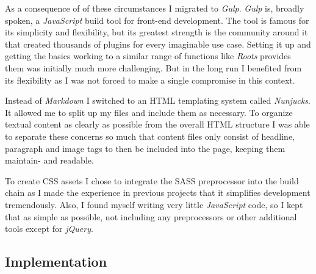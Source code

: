As a consequence of of these circumstances I migrated to \textit{Gulp}. \textit{Gulp} is, broadly spoken, a \textit{JavaScript} build tool for front-end development. The tool is famous for its simplicity and flexibility, but its greatest strength is the community around it that created thousands of plugins for every imaginable use case. Setting it up and getting the basics working to a similar range of functions like \textit{Roots} provides them was initially much more challenging. But in the long run I benefited from its flexibility as I was not forced to make a single compromise in this context.

Instead of \textit{Markdown} I switched to an \ac{HTML} templating system called \textit{Nunjucks}. It allowed me to split up my files and include them as necessary. To organize textual content as clearly as possible from the overall \ac{HTML} structure I was able to separate these concerns so much that content files only consist of headline, paragraph and image tags to then be included into the page, keeping them maintain- and readable.

To create \ac{CSS} assets I chose to integrate the \ac{SASS} preprocessor into the build chain as I made the experience in previous projects that it simplifies development tremendously. Also, I found myself writing very little \textit{JavaScript} code, so I kept that as simple as possible, not including any preprocessors or other additional tools except for \textit{jQuery}.

\subsection{Implementation}

